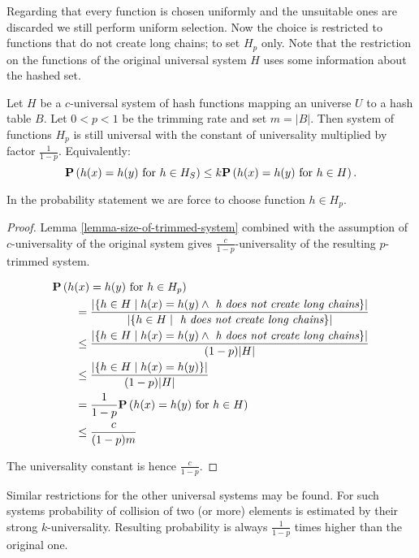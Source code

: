Regarding that every function is chosen uniformly and the unsuitable ones are discarded we still perform uniform selection. Now the choice is restricted to functions that do not create long chains; to set $H_p$ only. Note that the restriction on the functions of the original universal system $H$ uses some information about the hashed set.

\begin{theorem}
Let $H$ be a $c$-universal system of hash functions mapping an universe $U$ to a hash table $B$. Let $0 < p < 1$ be the trimming rate and set $m = |B|$. Then system of functions $H_p$ is still universal with the constant of universality multiplied by factor $\frac{1}{1 - p}$. Equivalently:
\[
	\mathbf{P}\left(h(x) = h(y) \text{ for } h \in H_S\right) \leq k \mathbf{P}\left(h(x) = h(y) \text{ for } h \in H\right) \text{.}
\]
\end{theorem}
In the probability statement we are force to choose function $h \in H_p$.
\begin{proof}
Lemma \ref{lemma-size-of-trimmed-system} combined with the assumption of $c$-universality of the original system gives $\frac{c}{1 - p}$-universality of the resulting $p$-trimmed system. 

\[
\begin{split}
& \mathbf{P}\left(h(x) = h(y) \text{ for } h \in H_p\right)  \\
	& \qquad =  \frac{|\{ h \in H \mid h(x) = h(y) \wedge \textit{ h does not create long chains} \}|}{|\lbrace h \in H \mid \textit{ h does not create long chains} \rbrace|} \\
	& \qquad \leq \frac{|\{ h \in H \mid h(x) = h(y) \wedge \textit{ h does not create long chains} \}|}{(1 - p)|H|} \\ 
	& \qquad \leq \frac{|\{ h \in H \mid h(x) = h(y) \}|}{(1 - p)|H|} \\
	& \qquad = \frac{1}{1 - p} \mathbf{P}\left(h(x) = h(y) \text{ for } h \in H\right) \\
	& \qquad \leq \frac{c}{(1 - p) m} \\
\end{split}
\]

The universality constant is hence $\frac{c}{1 - p}$.
\end{proof}

Similar restrictions for the other universal systems may be found. For such systems probability of collision of two (or more) elements is estimated by their strong $k$-universality. Resulting probability is always $\frac{1}{1 - p}$ times higher than the original one.

